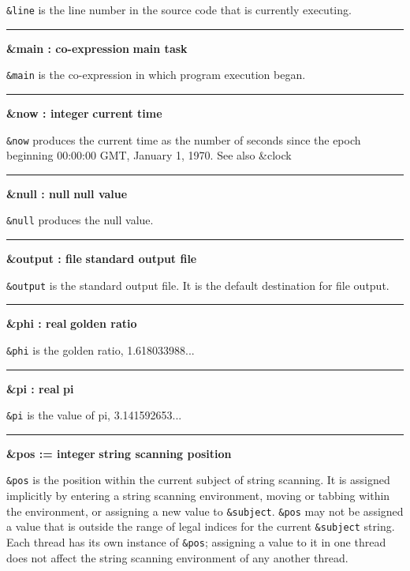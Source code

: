 \noindent
{}\texttt{\&line} is the line number in the
source code that is currently executing.

\bigskip\hrule\vspace{0.1cm}
\noindent
{\bf \&main : co{}-expression } \hfill {\bf main task}

\noindent
{}\texttt{\&main} is the co-expression in which program
execution began.

\bigskip\hrule\vspace{0.1cm}
\noindent
{\bf \&now : integer } \hfill {\bf current time}

\noindent
{}\texttt{\&now} produces the current time as the
number of seconds since the epoch beginning 00:00:00 GMT, January 1,
1970. See also \&clock

\bigskip\hrule\vspace{0.1cm}
\noindent
{\bf \&null : null } \hfill {\bf null value}

\noindent
{}\texttt{\&null} produces the null value.

\bigskip\hrule\vspace{0.1cm}
\noindent
{\bf \&output : file } \hfill {\bf standard output file}

\noindent
{}\texttt{\&output} is the standard
output file. It is the default destination for file output.

\bigskip\hrule\vspace{0.1cm}
\noindent
{\bf \&phi : real } \hfill {\bf golden ratio}

\noindent
{}\texttt{\&phi}
is the golden ratio, 1.618033988...

\bigskip\hrule\vspace{0.1cm}
\noindent
{\bf \&pi : real } \hfill {\bf pi}

\noindent
{}\texttt{\&pi} is the value of pi, 3.141592653...

\bigskip\hrule\vspace{0.1cm}
\noindent
{\bf \&pos := integer } \hfill {\bf string scanning position}

\noindent
{}\texttt{\&pos} is the position within the
current subject of string scanning. It is assigned implicitly by
entering a string scanning environment, moving or tabbing within the
environment, or assigning a new value to \texttt{\&subject}.
\texttt{\&pos} may not be assigned a value that is outside the range of
legal indices for the current \texttt{\&subject} string.
Each thread has its own instance of
\texttt{\&pos}; \ConcurrencyIssue assigning a value to it in one
thread does not affect the string scanning environment of any another thread.

